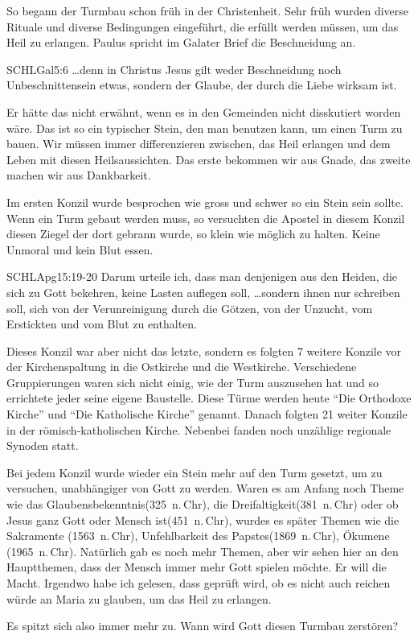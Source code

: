 \documentclass[fontsize=16pt]{mybib}
\begin{document}
\begin{otsblock}
    So begann der Turmbau schon früh in der Christenheit. Sehr früh wurden diverse Rituale und diverse Bedingungen eingeführt, die erfüllt werden müssen, um das Heil zu erlangen. 
    Paulus spricht im Galater Brief die Beschneidung an.
    \begin{bibelbox}{SCHL}{Gal}{5:6}
        \dots denn in Christus Jesus gilt weder Beschneidung noch Unbeschnittensein etwas, sondern der Glaube, der durch die Liebe wirksam ist.
    \end{bibelbox}
    Er hätte das nicht erwähnt, wenn es in den Gemeinden nicht disskutiert worden wäre. Das ist so ein typischer Stein, den man benutzen kann, um einen Turm zu bauen. Wir müssen immer differenzieren zwischen, das Heil erlangen und dem Leben mit diesen Heilsaussichten. Das erste bekommen wir aus Gnade, das zweite machen wir aus Dankbarkeit.

    Im ersten Konzil wurde besprochen wie gross und schwer so ein Stein sein sollte. Wenn ein Turm gebaut werden muss, so versuchten die Apostel in diesem Konzil diesen Ziegel der dort gebrann wurde, so klein wie möglich zu halten. Keine Unmoral und kein Blut essen. 
    \begin{bibelbox}{SCHL}{Apg}{15:19-20}
        Darum urteile ich, dass man denjenigen aus den Heiden, die sich zu Gott bekehren, keine Lasten auflegen soll,
        \dots sondern ihnen nur schreiben soll, sich von der Verunreinigung durch die Götzen, von der Unzucht, vom Erstickten und vom Blut zu enthalten.
    \end{bibelbox}
    Dieses Konzil war aber nicht das letzte, sondern es folgten 7 weitere Konzile vor der Kirchenspaltung in die Ostkirche und die Westkirche. Verschiedene Gruppierungen waren sich nicht einig, wie der Turm auszusehen hat und so errichtete jeder seine eigene Baustelle. Diese Türme werden heute \enquote{Die Orthodoxe Kirche} und \enquote{Die Katholische Kirche} genannt. Danach folgten 21 weiter Konzile in der römisch-katholischen Kirche. Nebenbei fanden noch unzählige regionale Synoden statt.
    
    Bei jedem Konzil wurde wieder ein Stein mehr auf den Turm gesetzt, um zu versuchen, unabhängiger von Gott zu werden. Waren es am Anfang noch Theme wie das Glaubensbekenntnis(325~n.\,Chr), die Dreifaltigkeit(381~n.\,Chr) oder ob Jesus ganz Gott oder Mensch ist(451~n.\,Chr), wurdes es später Themen wie die Sakramente (1563~n.\,Chr), Unfehlbarkeit des Papstes(1869~n.\,Chr), Ökumene (1965~n.\,Chr). Natürlich gab es noch mehr Themen, aber wir sehen hier an den Hauptthemen, dass der Mensch immer mehr Gott spielen möchte. Er will die Macht.
    Irgendwo habe ich gelesen, dass geprüft wird, ob es nicht auch reichen würde an Maria zu glauben, um das Heil zu erlangen.
    
    Es spitzt sich also immer mehr zu. Wann wird Gott diesen Turmbau zerstören?
\end{otsblock}
\end{document}
